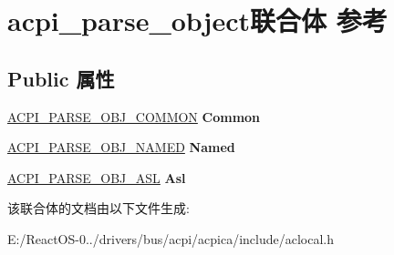 \hypertarget{unionacpi__parse__object}{}\section{acpi\+\_\+parse\+\_\+object联合体 参考}
\label{unionacpi__parse__object}
\subsection*{Public 属性}
\begin{DoxyCompactItemize}
\item 
\mbox{\label{unionacpi__parse__object_aadc72776a3c86dce8575f514c5c200fe}} 
\hyperlink{structacpi__parse__obj__common}{A\+C\+P\+I\+\_\+\+P\+A\+R\+S\+E\+\_\+\+O\+B\+J\+\_\+\+C\+O\+M\+M\+ON} {\bfseries Common}
\item 
\mbox{\label{unionacpi__parse__object_a53cad41f097c4eacb3ab691f8e6561bf}} 
\hyperlink{structacpi__parse__obj__named}{A\+C\+P\+I\+\_\+\+P\+A\+R\+S\+E\+\_\+\+O\+B\+J\+\_\+\+N\+A\+M\+ED} {\bfseries Named}
\item 
\mbox{\label{unionacpi__parse__object_aa5d2b4a98469d36e784e9823e11331e9}} 
\hyperlink{structacpi__parse__obj__asl}{A\+C\+P\+I\+\_\+\+P\+A\+R\+S\+E\+\_\+\+O\+B\+J\+\_\+\+A\+SL} {\bfseries Asl}
\end{DoxyCompactItemize}


该联合体的文档由以下文件生成\+:\begin{DoxyCompactItemize}
\item 
E\+:/\+React\+O\+S-\/0../drivers/bus/acpi/acpica/include/aclocal.\+h\end{DoxyCompactItemize}
